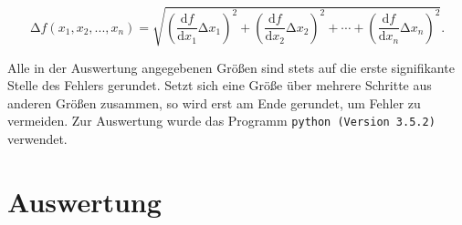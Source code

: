\documentclass[
  bibliography=totoc,     %
  captions=tableheading,  %
  titlepage=firstiscover, %
]{scrartcl}
\begin{document}
\begin{equation}
    \mathup{\Delta}f(x_1,x_2,...,x_n)=\sqrt{\left(\frac{\mathup{d}f}{\mathup{d}x_1}\mathup{\Delta}x_1\right)^2+\left(\frac{\mathup{d}f}{\mathup{d}x_2}\mathup{\Delta}x_2\right)^2+ \dotsb +\left(\frac{\mathup{d}f}{\mathup{d}x_n}\mathup{\Delta}x_n\right)^2}.
\end{equation}

Alle in der Auswertung angegebenen Größen sind stets auf die erste signifikante
Stelle des Fehlers gerundet. Setzt sich eine Größe über mehrere Schritte aus
anderen Größen zusammen, so wird erst am Ende gerundet, um Fehler zu vermeiden.
Zur Auswertung wurde das Programm \texttt{python (Version 3.5.2)} verwendet.
\newpage
\section{Auswertung}
\label{sec:auswertung}
\end{document}
